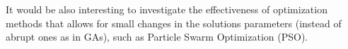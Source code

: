 \documentclass[a4paper]{llncs}
\begin{document}
It would be also interesting to investigate the effectiveness of optimization methods that allows for small changes in the solutions parameters (instead of abrupt ones as in GAs), such as Particle Swarm Optimization (PSO).


%
%

%
%
%
%
\end{document}
